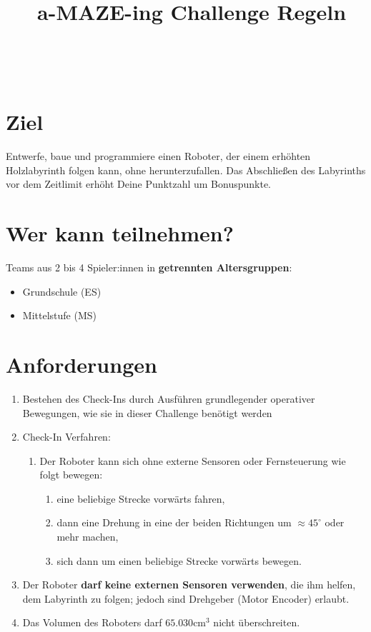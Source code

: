 \documentclass[a4paper,12pt]{article}
\begin{document}



\title{\tagYear\ a-MAZE-ing Challenge Regeln}

\makeatletter
\let\inserttitle\@title
\makeatother
\begin{center}
	\rrgerLogo
	\huge                      %
	\bfseries                   %
	\\
	\inserttitle
\end{center}
\section{Ziel}
Entwerfe, baue und programmiere einen Roboter, der einem erhöhten Holzlabyrinth
folgen kann, ohne herunterzufallen. Das Abschließen des Labyrinths vor dem
Zeitlimit erhöht Deine Punktzahl um Bonuspunkte.

\section{Wer kann teilnehmen?}
Teams aus 2 bis 4 Spieler:innen in \textbf{getrennten Altersgruppen}:

\begin{itemize}
	\item Grundschule (ES)
	\item Mittelstufe (MS)
\end{itemize}
\combineDivisions

\section{Anforderungen}
\robotRequirements
\begin{enumerate}
	\item Bestehen des Check-Ins durch Ausführen grundlegender operativer
		Bewegungen, wie sie in dieser Challenge benötigt werden
	\item Check-In Verfahren:
	\begin{enumerate}
		\item Der Roboter kann sich ohne externe Sensoren oder
			Fernsteuerung wie folgt bewegen:
		\begin{enumerate}
			\item eine beliebige Strecke vorwärts fahren,
			\item dann eine Drehung in eine der beiden Richtungen
				um $\approx 45^{\circ}$ oder mehr machen,
			\item sich dann um einen beliebige Strecke vorwärts
				bewegen.
		\end{enumerate}
	\end{enumerate}
	\item Der Roboter \textbf{darf keine externen Sensoren verwenden}, die
		ihm helfen, dem Labyrinth zu folgen; jedoch sind Drehgeber
		(Motor Encoder) erlaubt.
	\item Das Volumen des Roboters darf $65{.}030 \mathrm{cm}^{3}$ nicht überschreiten.
\end{enumerate}
\end{document}
